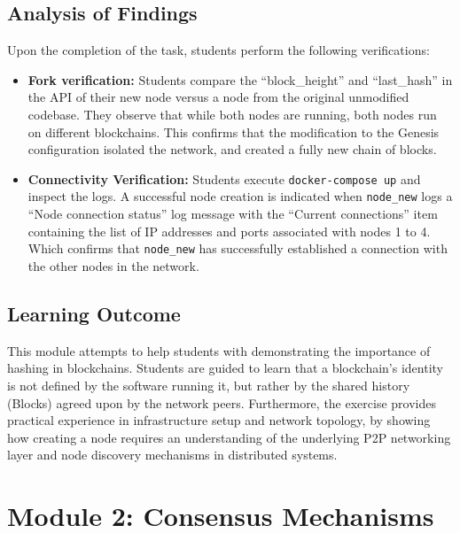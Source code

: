 \subsection{Analysis of Findings}
Upon the completion of the task, students perform the following verifications:

\begin{itemize}
    \item \textbf{Fork verification:} Students compare the \enquote{block\_height} and \enquote{last\_hash} in the API of their new node versus a node from the original unmodified codebase. They observe that while both nodes are running, both nodes run on different blockchains. This confirms that the modification to the Genesis configuration isolated the network, and created a fully new chain of blocks.
    \item \textbf{Connectivity Verification:} Students execute \texttt{docker-compose up} and inspect the logs. A successful node creation is indicated when \texttt{node\_new} logs a \enquote{Node connection status} log message with the \enquote{Current connections} item containing the list of IP addresses and ports associated with nodes 1 to 4. Which confirms that \texttt{node\_new} has successfully established a connection with the other nodes in the network.
\end{itemize}

\subsection{Learning Outcome}
This module attempts to help students with demonstrating the importance of hashing in blockchains. Students are guided to learn that a blockchain's identity is not defined by the software running it, but rather by the shared history (Blocks) agreed upon by the network peers. Furthermore, the exercise provides practical experience in infrastructure setup and network topology, by showing how creating a node requires an understanding of the underlying P2P networking layer and node discovery mechanisms in distributed systems.


\newpage
\section{Module 2: Consensus Mechanisms} \label{ch5_module2}


